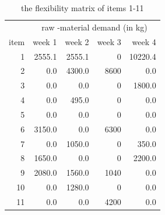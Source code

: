 \documentclass[preprint, 3p,
authoryear]{elsarticle} %
\begin{document}
\begin{table}[!h]

\caption{\label{tab:unnamed-chunk-7}the flexibility matrix of items 1-11}
\centering
\begin{tabular}[t]{r|r|r|r|r}
\hline
\multicolumn{1}{c|}{ } & \multicolumn{4}{c}{raw -material demand (in kg)} \\
\cline{2-5}
item & week 1 & week 2 & week 3 & week 4\\
\hline
1 & 2555.1 & 2555.1 & 0 & 10220.4\\
\hline
2 & 0.0 & 4300.0 & 8600 & 0.0\\
\hline
3 & 0.0 & 0.0 & 0 & 1800.0\\
\hline
4 & 0.0 & 495.0 & 0 & 0.0\\
\hline
5 & 0.0 & 0.0 & 0 & 0.0\\
\hline
6 & 3150.0 & 0.0 & 6300 & 0.0\\
\hline
7 & 0.0 & 1050.0 & 0 & 350.0\\
\hline
8 & 1650.0 & 0.0 & 0 & 2200.0\\
\hline
9 & 2080.0 & 1560.0 & 1040 & 0.0\\
\hline
10 & 0.0 & 1280.0 & 0 & 0.0\\
\hline
11 & 0.0 & 0.0 & 4200 & 0.0\\
\hline
\end{tabular}
\end{table}

\newpage
\end{document}
